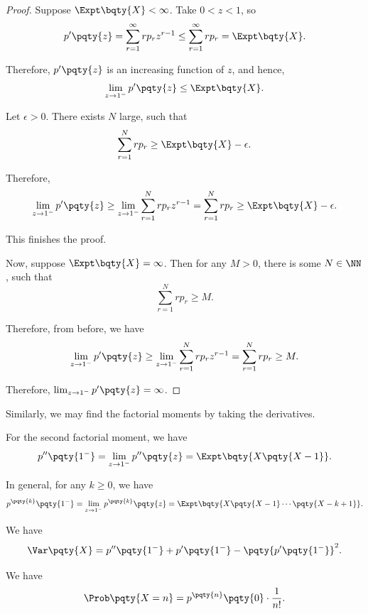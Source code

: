\begin{proof}
    Suppose \(\Expt\bqty{X} < \infty\). Take \(0 < z < 1\), so
    \[
        p'\pqty{z} = \sum_{r = 1}^{\infty} r p_r z^{r - 1} \leq \sum_{r = 1}^{\infty} r p_r = \Expt\bqty{X}.
    \]

    Therefore, \(p'\pqty{z}\) is an increasing function of \(z\), and hence,
    \[
        \lim_{z \to 1^{-}} p'\pqty{z} \leq \Expt\bqty{X}.
    \]

    Let \(\epsilon > 0\). There exists \(N\) large, such that
    \[
        \sum_{r = 1}^{N} r p_r \geq \Expt\bqty{X} - \epsilon.
    \]

    Therefore,
    \[
        \lim_{z \to 1^{-}} p'\pqty{z} \geq \lim_{z \to 1^{-}} \sum_{r = 1}^{N} r p_r z^{r - 1} = \sum_{r = 1}^{N} r p_r \geq \Expt\bqty{X} - \epsilon.
    \]

    This finishes the proof.

    Now, suppose \(\Expt\bqty{X} = \infty\). Then for any \(M > 0\), there is some \(N \in \NN\), such that
    \[
        \sum_{r = 1}^{N} r p_r \geq M.
    \]

    Therefore, from before, we have
    \[
        \lim_{z \to 1^{-}} p'\pqty{z} \geq \lim_{z \to 1^{-}} \sum_{r = 1}^{N} r p_r z^{r - 1} = \sum_{r = 1}^{N} r p_r \geq M.
    \]

    Therefore, \(\lim_{z \to 1^{-}} p'\pqty{z} = \infty\).
\end{proof}

Similarly, we may find the factorial moments by taking the derivatives.

\begin{theorem}
    \label{thm:factorial-moments-pgf}%
    For the second factorial moment, we have
    \[
        p''\pqty{1^-} = \lim_{z \to 1^-} p''\pqty{z} = \Expt\bqty{X \pqty{X - 1}}.
    \]

    In general, for any \(k \geq 0\), we have
    \[
        p^{\pqty{k}} \pqty{1^-} = \lim_{z \to 1^-} p^{\pqty{k}}\pqty{z} = \Expt\bqty{X \pqty{X - 1} \cdots \pqty{X - k + 1}}.
    \]
\end{theorem}

\begin{corollary}
    \label{cor:var-pgf}%
    We have
    \[
        \Var\pqty{X} = p''\pqty{1^-} + p'\pqty{1^-} - \pqty{p'\pqty{1^-}}^2.
    \]
\end{corollary}

\begin{proposition}
    \label{prop:prob-pgf}%
    We have
    \[
        \Prob\pqty{X = n} = p^{\pqty{n}} \pqty{0} \cdot \frac{1}{n!}.
    \]
\end{proposition}

